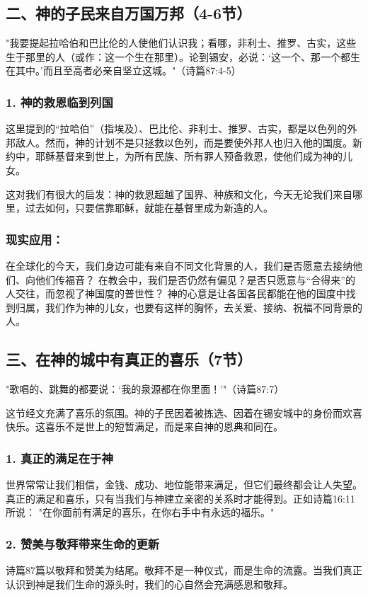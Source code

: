 \documentclass[a4paper, 12pt]{article}
\begin{document}
\subsection*{二、神的子民来自万国万邦（4-6节）}
"我要提起拉哈伯和巴比伦的人使他们认识我；看哪，非利士、推罗、古实，这些生于那里的人（或作：这一个生在那里）。论到锡安，必说：‘这一个、那一个都生在其中。’而且至高者必亲自坚立这城。"（诗篇87:4-5）

\subsubsection*{1. 神的救恩临到列国}
\hspace{0.6cm}这里提到的“拉哈伯”（指埃及）、巴比伦、非利士、推罗、古实，都是以色列的外邦敌人。然而，神的计划不是只拯救以色列，而是要使外邦人也归入他的国度。新约中，耶稣基督来到世上，为所有民族、所有罪人预备救恩，使他们成为神的儿女。

这对我们有很大的启发：神的救恩超越了国界、种族和文化，今天无论我们来自哪里，过去如何，只要信靠耶稣，就能在基督里成为新造的人。

\subsubsection*{现实应用：}

在全球化的今天，我们身边可能有来自不同文化背景的人，我们是否愿意去接纳他们、向他们传福音？
在教会中，我们是否仍然有偏见？是否只愿意与“合得来”的人交往，而忽视了神国度的普世性？
神的心意是让各国各民都能在他的国度中找到归属，我们作为神的儿女，也要有这样的胸怀，去关爱、接纳、祝福不同背景的人。

\subsection*{三、在神的城中有真正的喜乐（7节）}
"歌唱的、跳舞的都要说：‘我的泉源都在你里面！’"（诗篇87:7）

这节经文充满了喜乐的氛围。神的子民因着被拣选、因着在锡安城中的身份而欢喜快乐。这喜乐不是世上的短暂满足，而是来自神的恩典和同在。

\subsubsection*{1. 真正的满足在于神}
世界常常让我们相信，金钱、成功、地位能带来满足，但它们最终都会让人失望。真正的满足和喜乐，只有当我们与神建立亲密的关系时才能得到。正如诗篇16:11所说：
"在你面前有满足的喜乐，在你右手中有永远的福乐。"

\subsubsection*{2. 赞美与敬拜带来生命的更新}
诗篇87篇以敬拜和赞美为结尾。敬拜不是一种仪式，而是生命的流露。当我们真正认识到神是我们生命的源头时，我们的心自然会充满感恩和敬拜。
\end{document}
